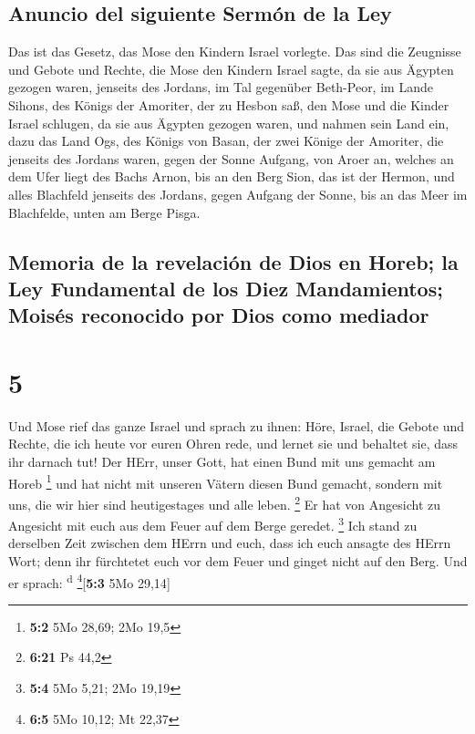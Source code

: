 \hypertarget{anuncio-del-siguiente-sermuxf3n-de-la-ley}{%
\subsection{Anuncio del siguiente Sermón de la
Ley}\label{anuncio-del-siguiente-sermuxf3n-de-la-ley}}

 Das ist das Gesetz, das Mose den Kindern Israel
vorlegte.  Das sind die Zeugnisse und Gebote und Rechte,
die Mose den Kindern Israel sagte, da sie aus Ägypten gezogen waren,
 jenseits des Jordans, im Tal gegenüber Beth-Peor, im
Lande Sihons, des Königs der Amoriter, der zu Hesbon saß, den Mose und
die Kinder Israel schlugen, da sie aus Ägypten gezogen waren,
 und nahmen sein Land ein, dazu das Land Ogs, des Königs
von Basan, der zwei Könige der Amoriter, die jenseits des Jordans waren,
gegen der Sonne Aufgang,  von Aroer an, welches an dem
Ufer liegt des Bachs Arnon, bis an den Berg Sion, das ist der Hermon,
 und alles Blachfeld jenseits des Jordans, gegen Aufgang
der Sonne, bis an das Meer im Blachfelde, unten am Berge Pisga.

\hypertarget{memoria-de-la-revelaciuxf3n-de-dios-en-horeb-la-ley-fundamental-de-los-diez-mandamientos-moisuxe9s-reconocido-por-dios-como-mediador}{%
\subsection{Memoria de la revelación de Dios en Horeb; la Ley
Fundamental de los Diez Mandamientos; Moisés reconocido por Dios como
mediador}\label{memoria-de-la-revelaciuxf3n-de-dios-en-horeb-la-ley-fundamental-de-los-diez-mandamientos-moisuxe9s-reconocido-por-dios-como-mediador}}

\hypertarget{section-4}{%
\section{5}\label{section-4}}

 Und Mose rief das ganze Israel und sprach zu ihnen: Höre,
Israel, die Gebote und Rechte, die ich heute vor euren Ohren rede, und
lernet sie und behaltet sie, dass ihr darnach tut!  Der
HErr, unser Gott, hat einen Bund mit uns gemacht am Horeb \footnote{\textbf{5:2}
  5Mo 28,69; 2Mo 19,5}  und hat nicht mit unseren Vätern
diesen Bund gemacht, sondern mit uns, die wir hier sind heutigestages
und alle leben. \footnote{\textbf{6:21} Ps 44,2}  Er hat
von Angesicht zu Angesicht mit euch aus dem Feuer auf dem Berge geredet.
\footnote{\textbf{5:4} 5Mo 5,21; 2Mo 19,19}  Ich stand zu
derselben Zeit zwischen dem HErrn und euch, dass ich euch ansagte des
HErrn Wort; denn ihr fürchtetet euch vor dem Feuer und ginget nicht auf
den Berg. Und er sprach: \textsuperscript{d} \footnote{\textbf{6:5} 5Mo
  10,12; Mt 22,37}{[}\textbf{5:3} 5Mo 29,14{]}

